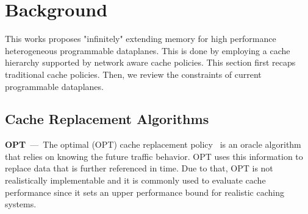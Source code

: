 


\section{Background}\label{sec:back}
This works proposes "infinitely" extending memory for high performance heterogeneous programmable dataplanes.
This is done by employing a cache hierarchy supported by network aware cache policies.
This section first recaps traditional cache policies. 
Then, we review the constraints of current programmable dataplanes.

\subsection{Cache Replacement Algorithms}
\textbf{OPT}~---~The optimal (OPT) cache replacement policy~\cite{Belady:66} is an oracle algorithm that relies on knowing the future traffic behavior.
OPT uses this information to replace data that is further referenced in time.
Due to that, OPT is not realistically implementable and it is commonly used to evaluate cache performance since it sets an upper performance bound for realistic caching systems.

